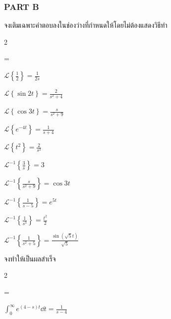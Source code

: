 \documentclass[12pt,final]{novelette} %
\begin{document}
\subsubsection*{PART B}

\begin{question}[resume]
    \item {}
    จงเติมเฉพาะคำตอบลงในช่องว่างที่กำหนดให้โดยไม่ต้องแสดงวิธีทำ 
    \begin{multicols}{2}
        \begin{question}
            \everymath={\displaystyle}
            \item
            $\mathcal{L}\left\{\frac12\right\} = \boxed{\frac{1}{2s}}$

            \item
            $\mathcal{L}\left\{\sin 2t\right\} = \boxed{\frac{2}{s^2+4}}$

            \item
            $\mathcal{L}\left\{\cos 3t\right\} = \boxed{\frac{s}{s^2+9}}$

            \item
            $\mathcal{L}\left\{e^{-4t}\right\} = \boxed{\frac{1}{s+4}}$

            \item
            $\mathcal{L}\left\{t^2\right\} = \boxed{\frac{2}{s^3}}$

            \item
            $\mathcal{L}^{-1}\left\{\frac3s\right\} = \boxed{3}$

            \item
            $\mathcal{L}^{-1}\left\{\frac{s}{s^2+9}\right\} = \boxed{\cos 3t}$

            \item
            $\mathcal{L}^{-1}\left\{\frac{1}{s-5}\right\} = \boxed{e^{5t}}$

            \item
            $\mathcal{L}^{-1}\left\{\frac{1}{s^3}\right\} = \boxed{\frac{t^2}{2}}$

            \item
            $\mathcal{L}^{-1}\left\{\frac{1}{s^2+5}\right\} = \boxed{\frac{\sin(\sqrt5 t)}{\sqrt5}}$
        \end{question}
    \end{multicols}

    \item {}
    จงทำให้เป็นผลสำเร็จ 
    \begin{multicols}{2}
        \begin{question}
            \everymath={\displaystyle}
            \item
            $\int_0^\infty e^{(4-s)t} \dd{t} = \boxed{\frac{1}{s-4}}$


\end{question}
\end{multicols}
\end{question}
\end{document}
